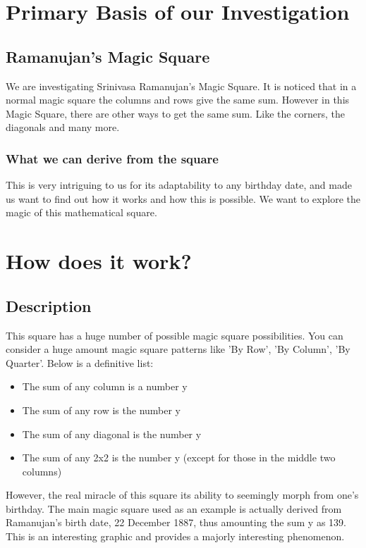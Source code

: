 \documentclass{article}
\begin{document}
\newpage
\section{Primary Basis of our Investigation}

\subsection{Ramanujan's Magic Square}
\tab We are investigating Srinivasa Ramanujan's Magic Square. It is noticed that in a normal magic square the columns and rows give the same sum. However in this Magic Square, there are other ways to get the same sum. Like the corners, the diagonals and many more.

\subsubsection{What we can derive from the square}
\tab This is very intriguing to us for its adaptability to any birthday date, and made us want to find out how it works and how this is possible. We want to explore the magic of this mathematical square.

\newpage
\section{How does it work?}

\subsection{Description}
\tab This square has a huge number of possible magic square possibilities. You can consider a huge amount magic square patterns like 'By Row', 'By Column', 'By Quarter'.  Below is a definitive list:

\begin{itemize}
  \item The sum of any column is a number y
  \item The sum of any row is the number y
  \item The sum of any diagonal is the number y
  \item The sum of any 2x2 is the number y (except for those in the middle two columns)
\end{itemize}

However, the real miracle of this square its ability to seemingly morph from one's birthday. The main magic square used as an example is actually derived from Ramanujan's birth date, 22 December 1887, thus amounting the sum y as 139. This is an interesting graphic and provides a majorly interesting phenomenon.
\end{document}
